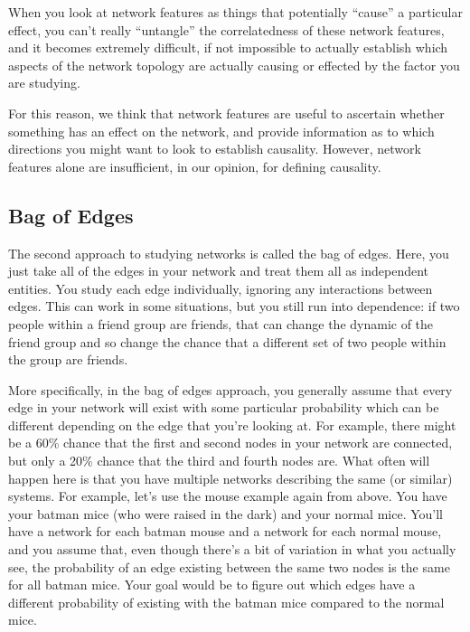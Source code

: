 When you look at network features as things that potentially ``cause'' a particular effect, you can't really ``untangle'' the correlatedness of these network features, and it becomes extremely difficult, if not {impossible}  to actually establish which aspects of the network topology are actually causing or effected by the factor you are studying. 

For this reason, we think that network features are useful to {ascertain} whether something has an effect on the network, and provide information as to which directions you might want to look to establish causality. However, network features alone are insufficient, in our opinion, for defining causality. 

\subsection{Bag of Edges}
\label{sec:ch4:net-rep:bagofedges}

The second approach to studying networks is called the bag of edges. Here, you just take all of the edges in your network and treat them all as independent entities. You study each edge individually, ignoring any interactions between edges. This can work in some situations, but you still run into dependence: if two people within a friend group are friends, that can change the dynamic of the friend group and so change the chance that a different set of two people within the group are friends.

More specifically, in the bag of edges approach, you generally assume that every edge in your network will exist with some particular {probability} which can be different depending on the edge that you're looking at. For example, there might be a 60\% chance that the first and second nodes in your network are connected, but only a 20\% chance that the third and fourth nodes are. What often will happen here is that you have multiple networks describing the same (or similar) systems. For example, let's use the mouse example again from above. You have your batman mice (who were raised in the dark) and your normal mice. You'll have a network for each batman mouse and a network for each normal mouse, and you assume that, even though there's a bit of variation in what you actually see, the {probability} of an edge existing between the same two nodes is the same for all batman mice. Your goal would be to figure out which edges have a different {probability} of existing with the batman mice compared to the normal mice.

